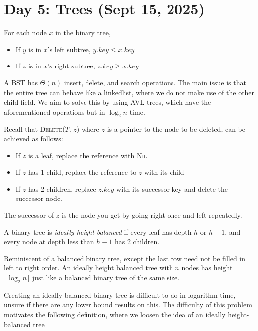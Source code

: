 \section{Day 5: Trees (Sept 15, 2025)}

\begin{definition}
For each node $x$ in the binary tree,
\begin{itemize}
\item If $y$ is in $x$'s left subtree, $y.key \leq x.key$ 
\item If $z$ is in $x$'s right subtree, $z.key \geq x.key$
\end{itemize}
\end{definition}

A BST has $\Theta(n)$ insert, delete, and search operations. The main issue is that the entire tree can behave like a linkedlist, where we do not make use of the other child field. We aim to solve this by using AVL trees, which have the aforementioned operations but in $\log_2 n$ time. 

Recall that \textsc{Delete}($T$, $z$) where $z$ is a pointer to the node to be deleted, can be achieved as follows:
\begin{itemize}
\item If $z$ is a leaf, replace the reference with \textsc{Nil}
\item If $z$ has 1 child, replace the reference to $z$ with its child
\item If $z$ has 2 children, replace $z.key$ with its successor key and delete the successor node. 
\end{itemize}
\noindent The successor of $z$ is the node you get by going right once and left repeatedly.

\begin{definition}
A binary tree is \textit{ideally height-balanced} if every leaf has depth $h$ or $h-1$, and every node at depth less than $h - 1$ has 2 children. 
\end{definition}
Reminiscent of a balanced binary tree, except the last row need not be filled in left to right order. An ideally height balanced tree with $n$ nodes has height $\lfloor \log_2 n \rfloor$ just like a balanced binary tree of the same size.

Creating an ideally balanced binary tree is difficult to do in logarithm time, unsure if there are any lower bound results on this. The difficulty of this problem motivates the following definition, where we loosen the idea of an ideally height-balanced tree

